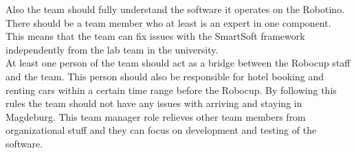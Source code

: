Also the team should fully understand the software it operates on the Robotino. There should be a team member who at least is an expert in one component. This means that the team can fix issues with the SmartSoft framework independently from the lab team in the university. \\
 
At least one person of the team should act as a bridge between the Robocup staff and the team. This person should also be responsible for hotel booking and renting cars within a certain time range before the Robocup. By following this rules the team should not have any issues with arriving and staying in Magdeburg. This team manager role relieves other team members from organizational stuff and they can focus on development and testing of the software.     
 
